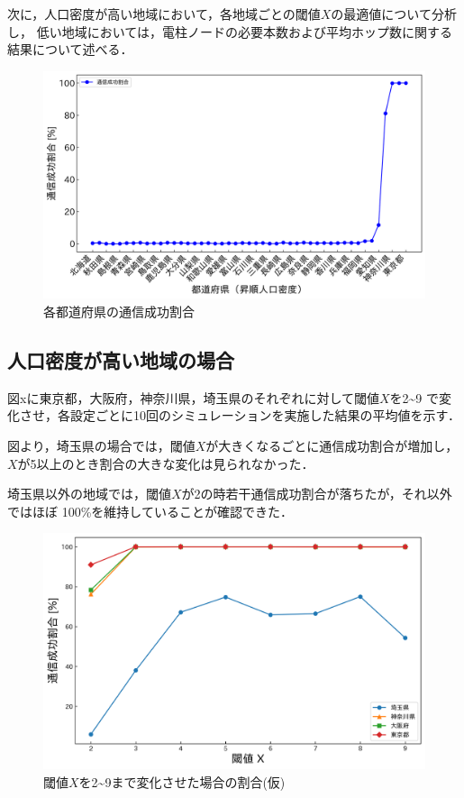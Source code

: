\documentclass[a4paper, 11pt]{ltjsarticle}
\begin{document}
次に，人口密度が高い地域において，各地域ごとの閾値$X$の最適値について分析し，
低い地域においては，電柱ノードの必要本数および平均ホップ数に関する結果について述べる．

\begin{figure}[h]
  \centering
  \includegraphics[width=130mm]{通信成功率グラフ.png}
  \caption{各都道府県の通信成功割合}
  \label{figure:各都道府県の通信成功割合}
\end{figure}

\subsection{人口密度が高い地域の場合}
図xに東京都，大阪府，神奈川県，埼玉県のそれぞれに対して閾値$X$を2\textasciitilde 9
で変化させ，各設定ごとに10回のシミュレーションを実施した結果の平均値を示す．

図より，埼玉県の場合では，閾値$X$が大きくなるごとに通信成功割合が増加し，
$X$が5以上のとき割合の大きな変化は見られなかった．

埼玉県以外の地域では，閾値$X$が2の時若干通信成功割合が落ちたが，それ以外ではほぼ
100\%を維持していることが確認できた．
\clearpage
\begin{figure}[h]
  \centering
  \includegraphics[width=130mm]{人口密度が高い場合の通信成功割合.png}
  \caption{閾値$X$を2\textasciitilde 9まで変化させた場合の割合(仮)}
  \label{figure:人口密度高い}
\end{figure}
\end{document}
